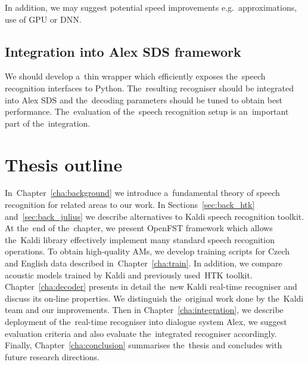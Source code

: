 In addition, we may suggest potential speed improvements e.g.\ approximations, use of \ac{GPU} or \ac{DNN}\cite{vesely2013sequencediscriminative}.

\subsection[Integration into Alex \acs{SDS} framework]{Integration into Alex \acl{SDS} framework} 
\label{sub:integration}
We should develop a~thin wrapper which efficiently exposes the~speech recognition interfaces to Python.
The~resulting recogniser should be integrated into Alex \ac{SDS} and the~decoding parameters should be tuned to obtain best performance.
The~evaluation of the~speech recognition setup is an~important part of the~integration.

\section*{Thesis outline} 
In~Chapter~\ref{cha:background} we introduce a~fundamental theory of speech recognition for related areas to our work.
In Sections~\ref{sec:back_htk} and~\ref{sec:back_julius} we describe alternatives to Kaldi speech recognition toolkit. 
At the~end of the~chapter, we present OpenFST framework which allows the~Kaldi library effectively implement many standard speech recognition operations. 
To obtain high-quality \aclp{AM}, we develop training scripts for Czech and English data described in~Chapter~\ref{cha:train}. 
In addition, we compare acoustic models trained by Kaldi and previously used~\ac{HTK} toolkit. 
Chapter~\ref{cha:decoder} presents in detail the~new Kaldi real-time recogniser and discuss its on-line properties.
We distinguish the~original work done by the~Kaldi team and our improvements. 
Then in Chapter~\ref{cha:integration}, we describe deployment of the~real-time recogniser into dialogue system Alex, we suggest evaluation criteria and also evaluate the~integrated recogniser accordingly.
Finally, Chapter~\ref{cha:conclusion} summarises the~thesis and concludes with future research directions.
